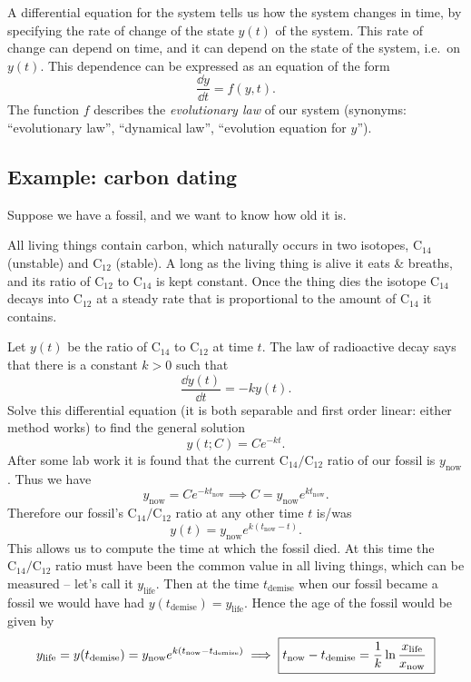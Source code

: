 A differential equation for the system tells us how the system changes in time, by
specifying the rate of change of the state $y(t)$ of the system.  This rate of change
can depend on time, and it can depend on the state of the system, i.e.~on $y(t)$.
This dependence can be expressed as an equation of the form
\begin{equation}
  \label{eq:dynamics1}
  \frac{\dd y}{\dd t} = f(y, t).
\end{equation}
The function $f$ describes the \textit{evolutionary law} of our system (synonyms:
``evolutionary law'', ``dynamical law'', ``evolution equation for $y$'').

\subsection{Example: carbon dating} %
Suppose we have a fossil, and we want to know how old it is.

All living things contain carbon, which naturally occurs in two isotopes,
$\mathrm{C}_{14}$ (unstable) and $\mathrm{C}_{12}$ (stable). A long as the living
thing is alive it eats \& breaths, and its ratio of $\mathrm{C}_{12}$ to
$\mathrm{C}_{14}$ is kept constant.  Once the thing dies the isotope
$\mathrm{C}_{14}$ decays into $\mathrm{C}_{12}$ at a steady rate that is
proportional to the amount of $\mathrm{C}_{14}$ it contains.

Let $y(t)$ be the ratio of $\mathrm{C}_{14}$ to $\mathrm{C}_{12}$ at time $t$. The
law of radioactive decay says that there is a constant $k>0$ such that
\[
\frac{\dd y(t)}{\dd t} = -k y (t).
\]
Solve this differential equation (it is both separable and first order linear: either
method works) to find the general solution
\[
y (t; C) = Ce^{-kt}.
\]
After some lab work it is found that the current $\mathrm{C}_{14} /\mathrm{C}_{12}$
ratio of our fossil is $y_{\text{now}}$. Thus we have
\[
y_{\text{now}} = Ce^{-kt_{\text{now} }} \implies C= y_{\text{now}}e^{kt_{\text{now} }}.
\]
Therefore our fossil's $\mathrm{C}_{14} /\mathrm{C}_{12}$ ratio at any other time $t$
is/was
\[
y (t) = y_{\text{now}}e^{k (t_{\text{now}}-t)}.
\]
This allows us to compute the time at which the fossil died. At this time the
$\mathrm{C}_{14} / \mathrm{C}_{12}$ ratio must have been the common value in all
living things, which can be measured -- let's call it $y_{\text{life}}$. Then at the
time $t_{\text{demise}}$ when our fossil became a fossil we would have had
$y(t_{\text{demise}}) = y_{\text{life}}$. Hence the age of the fossil would be given
by
\[
y_{\text{life}} = y(t_{\text{demise}}) = y_{\text{now}}e^{k
  (t_{\text{now}}-t_{\text{demise}})} \implies\text{\fbox{$\displaystyle
    t_{\text{now}}-t_{\text{demise}} = \frac1k \ln \frac{x_{\text{life} }}{
      x_{\text{now} }}$ }}
\]



